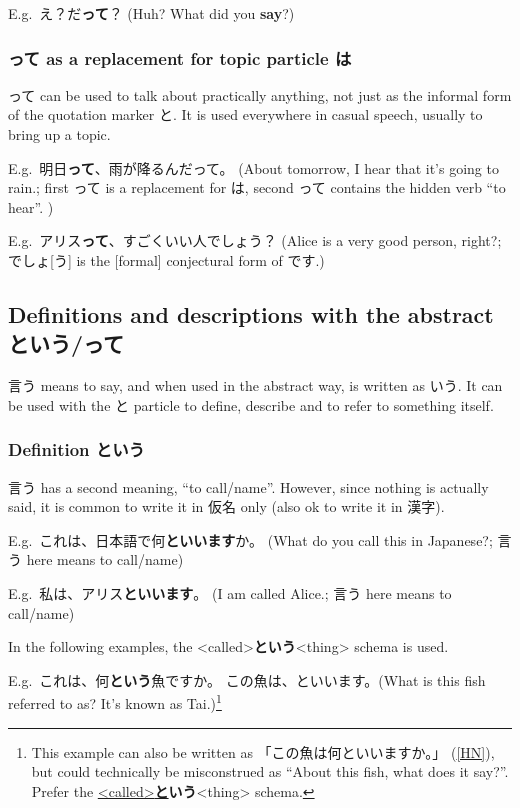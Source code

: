 \documentclass[../nihongo-gakushuu-kyouzai.tex]{subfiles}
\begin{document}
E.g.\ え？だ\textbf{って}？ (Huh? What did you \textbf{say}?)

\subsubsection{って as a replacement for topic particle は} \label{sec:tte-as-replacement-for-ha}

って can be used to talk about practically anything, not just as the informal form of the quotation marker と. It is used everywhere in casual speech, usually to bring up a topic.

E.g.\ 明日\textbf{って}、雨が降るんだって。 (About tomorrow, I hear that it's going to rain.; first って is a replacement for は, second って contains the hidden verb ``to hear''. )

E.g.\ アリス\textbf{って}、すごくいい人でしょう？ (Alice is a very good person, right?; でしょ[う] is the [formal] conjectural form of です.)

\subsection{Definitions and descriptions with the abstract という/って} \label{sec:definitions-and-descriptions}

言う means to say, and when used in the abstract way, is written as いう. It can be used with the と particle to define, describe and to refer to something itself.

\subsubsection{Definition という} \label{sec:definition-toiu}
言う has a second meaning, ``to call/name''. However, since nothing is actually said, it is common to write it in 仮名 only (also ok to write it in 漢字).

E.g.\ これは、日本語で何\textbf{といいます}か。 (What do you call this in Japanese?; 言う here means to call/name)

E.g.\ 私は、アリス\textbf{といいます}。 (I am called Alice.; 言う here means to call/name)

In the following examples, the <called>\textbf{という}<thing> schema is used.

E.g.\ これは、何\textbf{という}魚ですか。 この魚は、といいます。(What is this fish referred to as? It's known as Tai.)\footnote{This example can also be written as 「この魚は何といいますか。」 (\href{https://ja.hinative.com/questions/16255453}{[HN]}), but could technically be misconstrued as ``About this fish, what does it say?''. Prefer the \ul{<called>\textbf{と}}\textbf{いう}<thing> schema.}
\end{document}
